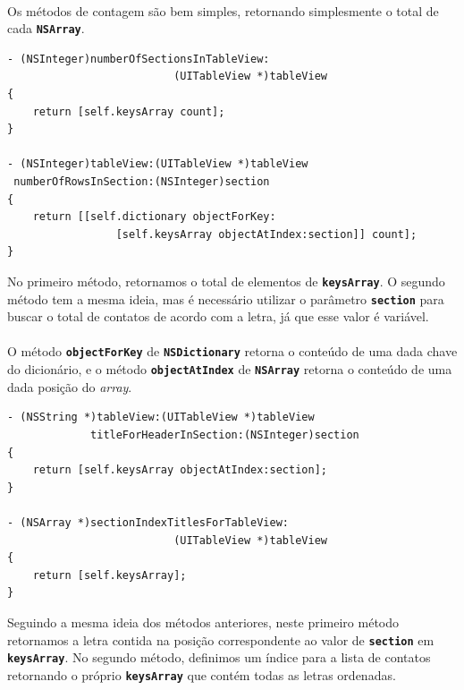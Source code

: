 \documentclass[a4paper,12pt,brazil,doubleside]{book}
\begin{document}
\pagebreak

\paragraph{}Os métodos de contagem são bem simples, retornando simplesmente o total de cada \texttt{\textbf{NSArray}}.

\begin{listing}
\begin{verbatim}
- (NSInteger)numberOfSectionsInTableView:
                          (UITableView *)tableView
{
    return [self.keysArray count];
}

- (NSInteger)tableView:(UITableView *)tableView
 numberOfRowsInSection:(NSInteger)section
{
    return [[self.dictionary objectForKey:
                 [self.keysArray objectAtIndex:section]] count];
}
\end{verbatim}
\end{listing}

No primeiro método, retornamos o total de elementos de \texttt{\textbf{keysArray}}. O segundo método tem a mesma ideia, mas é necessário utilizar o parâmetro \texttt{\textbf{section}} para buscar o total de contatos de acordo com a letra, já que esse valor é variável.
\paragraph{}O método \texttt{\textbf{objectForKey}} de \texttt{\textbf{NSDictionary}} retorna o conteúdo de uma dada chave do dicionário, e o método \texttt{\textbf{objectAtIndex}} de \texttt{\textbf{NSArray}} retorna o conteúdo de uma dada posição do \emph{array}.

\begin{listing}
\begin{verbatim}
- (NSString *)tableView:(UITableView *)tableView
             titleForHeaderInSection:(NSInteger)section
{
    return [self.keysArray objectAtIndex:section];
}

- (NSArray *)sectionIndexTitlesForTableView:
                          (UITableView *)tableView
{    
    return [self.keysArray];
}
\end{verbatim}
\end{listing}

Seguindo a mesma ideia dos métodos anteriores, neste primeiro método retornamos a letra contida na posição correspondente ao valor de \texttt{\textbf{section}} em \texttt{\textbf{keysArray}}. No segundo método, definimos um índice para a lista de contatos retornando o próprio \texttt{\textbf{keysArray}} que contém todas as letras ordenadas.
\end{document}
